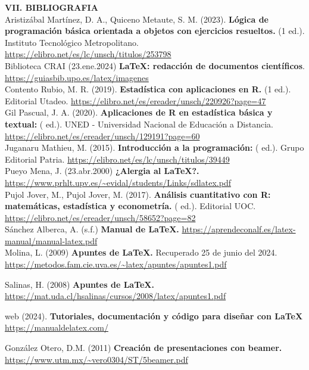\documentclass[12pt,a4paper]{article}
\begin{document}
\textbf{VII. BIBLIOGRAFIA}\\

Aristizábal Martínez, D. A., Quiceno Metaute, S. M. (2023). \textbf{Lógica de programación básica orientada a objetos con ejercicios resueltos.} (1 ed.). Instituto Tecnológico Metropolitano. \url{https://elibro.net/es/lc/unsch/titulos/253798}\\

Biblioteca CRAI (23.ene.2024) \textbf{\LaTeX: redacción de documentos científicos}. \url{https://guiasbib.upo.es/latex/imagenes}\\

Contento Rubio, M. R. (2019). \textbf{Estadística con aplicaciones en R.} (1 ed.). Editorial Utadeo. \url{https://elibro.net/es/ereader/unsch/220926?page=47} \\

Gil Pascual, J. A. (2020). \textbf{Aplicaciones de R en estadística básica y textual:} ( ed.). UNED - Universidad Nacional de Educación a Distancia. \url{https://elibro.net/es/ereader/unsch/129191?page=60}\\

Juganaru Mathieu, M. (2015). \textbf{Introducción a la programación:} ( ed.). Grupo Editorial Patria. \url{https://elibro.net/es/lc/unsch/titulos/39449}\\

Pueyo Mena, J. (23.abr.2000) \textbf{¿Alergia al \LaTeX?.} \url{https://www.prhlt.upv.es/~evidal/students/Links/sdlatex.pdf}\\

Pujol Jover, M., Pujol Jover, M. (2017). \textbf{Análisis cuantitativo con R: matemáticas, estadística y econometría.} ( ed.). Editorial UOC. \url{https://elibro.net/es/ereader/unsch/58652?page=82}\\

Sánchez Alberca, A. (s.f.) \textbf{Manual de \LaTeX.} \url{https://aprendeconalf.es/latex-manual/manual-latex.pdf} \\

Molina, L. (2009) \textbf{Apuntes de \LaTeX.} Recuperado 25 de junio del 2024. \url{https://metodos.fam.cie.uva.es/~latex/apuntes/apuntes1.pdf}

Salinas, H. (2008) \textbf{Apuntes de \LaTeX.} \url{https://mat.uda.cl/hsalinas/cursos/2008/latex/apuntes1.pdf}

web (2024). \textbf{Tutoriales, documentación y código para diseñar con \LaTeX} \url{https://manualdelatex.com/}

González Otero, D.M. (2011) \textbf{Creación de presentaciones con beamer.} \url{https://www.utm.mx/~vero0304/ST/5beamer.pdf}
\end{document}
